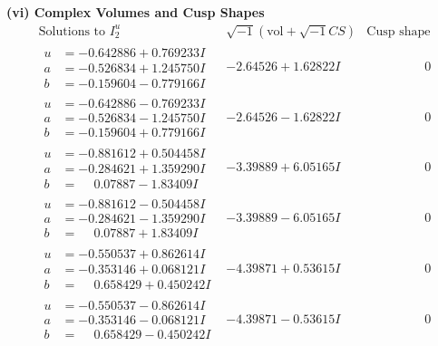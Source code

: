 \documentclass[1p]{elsarticle_modified}
\theoremstyle{definition}
\newcommand{\I}{\sqrt{-1}}
\begin{document}
\newpage\flushleft \textbf{(vi) Complex Volumes and Cusp Shapes}
$$\begin{array}{c|c|c}  
\text{Solutions to }I^u_{2}& \I (\text{vol} + \sqrt{-1}CS) & \text{Cusp shape}\\
 \hline 
\begin{aligned}
u &= -0.642886 + 0.769233 I \\
a &= -0.526834 + 1.245750 I \\
b &= -0.159604 - 0.779166 I\end{aligned}
 & -2.64526 + 1.62822 I & \phantom{-0.000000 } 0 \\ \hline\begin{aligned}
u &= -0.642886 - 0.769233 I \\
a &= -0.526834 - 1.245750 I \\
b &= -0.159604 + 0.779166 I\end{aligned}
 & -2.64526 - 1.62822 I & \phantom{-0.000000 } 0 \\ \hline\begin{aligned}
u &= -0.881612 + 0.504458 I \\
a &= -0.284621 + 1.359290 I \\
b &= \phantom{-}0.07887 - 1.83409 I\end{aligned}
 & -3.39889 + 6.05165 I & \phantom{-0.000000 } 0 \\ \hline\begin{aligned}
u &= -0.881612 - 0.504458 I \\
a &= -0.284621 - 1.359290 I \\
b &= \phantom{-}0.07887 + 1.83409 I\end{aligned}
 & -3.39889 - 6.05165 I & \phantom{-0.000000 } 0 \\ \hline\begin{aligned}
u &= -0.550537 + 0.862614 I \\
a &= -0.353146 + 0.068121 I \\
b &= \phantom{-}0.658429 + 0.450242 I\end{aligned}
 & -4.39871 + 0.53615 I & \phantom{-0.000000 } 0 \\ \hline\begin{aligned}
u &= -0.550537 - 0.862614 I \\
a &= -0.353146 - 0.068121 I \\
b &= \phantom{-}0.658429 - 0.450242 I\end{aligned}
 & -4.39871 - 0.53615 I & \phantom{-0.000000 } 0 \\ \hline\begin{aligned}

\end{aligned}
\end{array}$$
\end{document}
